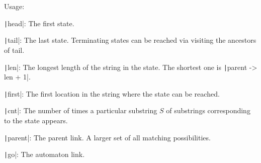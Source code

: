 Usage:
\begin{compactenum}
\item \texttt|head|: The first state.
\item \texttt|tail|: The last state. Terminating states can be reached via visiting the ancestors of tail.
\item \texttt|len|: The longest length of the string in the state. The shortest one is \texttt|parent -> len + 1|.
\item \texttt|first|: The first location in the string where the state can be reached.
\item \texttt|cnt|: The number of times a particular substring $S$ of substrings corresponding to the state appears.
\item \texttt|parent|: The parent link. A larger set of all matching possibilities.
\item \texttt|go|: The automaton link.
\end{compactenum}
\inputminted{cpp}{src/string/suffix/suffix-automaton.cpp.com}
